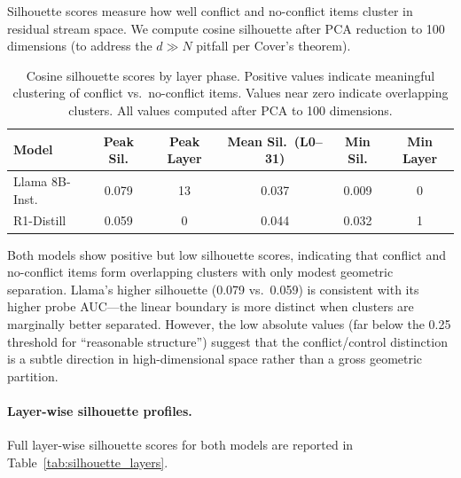 \documentclass[accepted]{article}
\begin{document}
Silhouette scores measure how well conflict and no-conflict items
cluster in residual stream space.  We compute cosine silhouette after
PCA reduction to 100 dimensions (to address the $d \gg N$ pitfall
per Cover's theorem).

\begin{table}[ht]
\centering
\caption{Cosine silhouette scores by layer phase.  Positive values
  indicate meaningful clustering of conflict vs.\ no-conflict items.
  Values near zero indicate overlapping clusters.  All values computed
  after PCA to 100 dimensions.}
\label{tab:silhouette}
\vspace{4pt}
\small
\begin{tabular}{lccccc}
\toprule
\textbf{Model} & \textbf{Peak Sil.} & \textbf{Peak Layer} &
  \textbf{Mean Sil.\ (L0--31)} & \textbf{Min Sil.} & \textbf{Min Layer} \\
\midrule
Llama 8B-Inst. & 0.079 & 13 & 0.037 & 0.009 & 0 \\
R1-Distill     & 0.059 & 0  & 0.044 & 0.032 & 1 \\
\bottomrule
\end{tabular}
\end{table}

\noindent Both models show positive but low silhouette scores,
indicating that conflict and no-conflict items form overlapping
clusters with only modest geometric separation.  Llama's higher
silhouette (0.079 vs.\ 0.059) is consistent with its higher probe
AUC---the linear boundary is more distinct when clusters are
marginally better separated.  However, the low absolute values
(far below the 0.25 threshold for ``reasonable structure'') suggest
that the conflict/control distinction is a subtle direction in high-dimensional
space rather than a gross geometric partition.

\paragraph{Layer-wise silhouette profiles.}
Full layer-wise silhouette scores for both models are reported in
Table~\ref{tab:silhouette_layers}.
\end{document}
